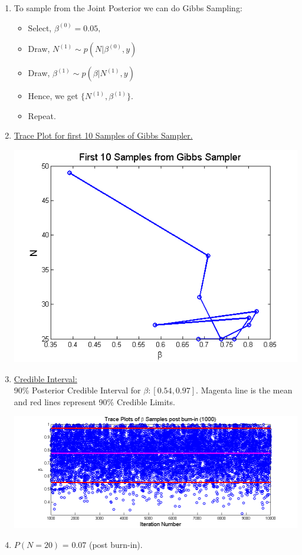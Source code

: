 \documentclass{article}
\begin{document}
\begin{enumerate}
\pagebreak
\item To sample from the Joint Posterior we can do Gibbs Sampling:\\
\begin{itemize}
\item Select, $\beta^{(0)}=0.05,$
\item Draw, $N^{(1)} \sim p(N|\beta^{(0)},y)$
\item Draw, $\beta^{(1)} \sim p(\beta|N^{(1)},y)$
\item Hence, we get $\{N^{(1)},\beta^{(1)}\}$.
\item Repeat.
\end{itemize}

\item \underline{Trace Plot for first 10 Samples of Gibbs Sampler.}\\
\begin{center}
\includegraphics[scale=0.5]{First10Samples.png}\\
\end{center}

\item \underline{Credible Interval:}\\
90\% Posterior Credible Interval for $\beta:[0.54,0.97]$. Magenta line is the mean and red lines represent 90\% Credible Limits.\\
\begin{center}
\includegraphics[scale=0.5]{BetaCredIntervals.png}\\
\end{center}

\item \underline{$P(N=20)$} = 0.07 (post burn-in).\\
\end{enumerate}

\pagebreak
{}\\

\end{document}
